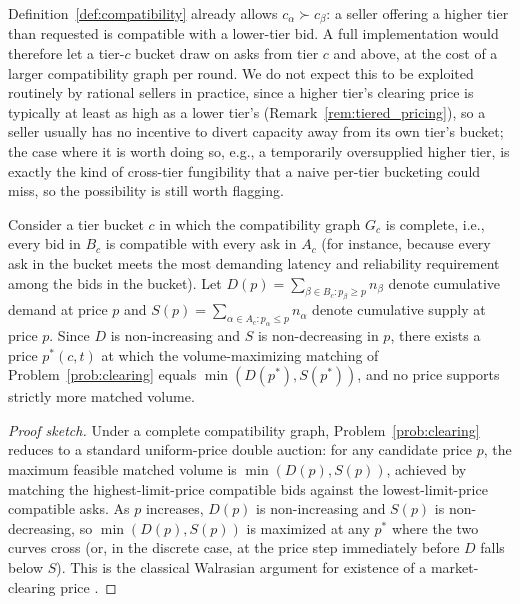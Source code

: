 \begin{remark}
\label{rem:tier_generalization}
Definition~\ref{def:compatibility} already allows $c_\alpha \succ c_\beta$:
a seller offering a higher tier than requested is compatible with a
lower-tier bid. A full implementation would therefore let a tier-$c$
bucket draw on asks from tier $c$ and above, at the cost of a larger
compatibility graph per round. We do not expect this to be exploited
routinely by rational sellers in practice, since a higher tier's clearing
price is typically at least as high as a lower tier's (Remark~\ref{rem:tiered_pricing}),
so a seller usually has no incentive to divert capacity away from its own
tier's bucket; the case where it is worth doing so, e.g., a temporarily
oversupplied higher tier, is exactly the kind of cross-tier fungibility
that a naive per-tier bucketing could miss, so the possibility is still
worth flagging.
\end{remark}

\begin{proposition}
\label{prop:existence}
Consider a tier bucket $c$ in which the compatibility graph $G_c$ is
complete, i.e., every bid in $B_c$ is compatible with every ask in $A_c$
(for instance, because every ask in the bucket meets the most demanding
latency and reliability requirement among the bids in the bucket). Let
$D(p) = \sum_{\beta \in B_c : p_\beta \geq p} n_\beta$ denote cumulative
demand at price $p$ and $S(p) = \sum_{\alpha \in A_c : p_\alpha \leq p}
n_\alpha$ denote cumulative supply at price $p$. Since $D$ is
non-increasing and $S$ is non-decreasing in $p$, there exists a price
$p^*(c, t)$ at which the volume-maximizing matching of
Problem~\ref{prob:clearing} equals $\min(D(p^*), S(p^*))$, and no price
supports strictly more matched volume.
\end{proposition}

\begin{proof}[Proof sketch]
Under a complete compatibility graph, Problem~\ref{prob:clearing} reduces
to a standard uniform-price double auction: for any candidate price $p$,
the maximum feasible matched volume is $\min(D(p), S(p))$, achieved by
matching the highest-limit-price compatible bids against the
lowest-limit-price compatible asks. As $p$ increases, $D(p)$ is
non-increasing and $S(p)$ is non-decreasing, so $\min(D(p), S(p))$ is
maximized at any $p^*$ where the two curves cross (or, in the discrete
case, at the price step immediately before $D$ falls below $S$). This is
the classical Walrasian argument for existence of a market-clearing price
\cite{mcafee1992}.
\end{proof}

